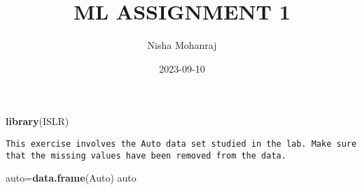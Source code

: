 \documentclass[
]{article}
\title{ML ASSIGNMENT 1}
\author{Nisha Mohanraj}
\date{2023-09-10}
\newenvironment{Shaded}{\begin{snugshade}}{\end{snugshade}}
\newcommand{\FunctionTok}[1]{\textcolor[rgb]{0.13,0.29,0.53}{\textbf{#1}}}
\newcommand{\NormalTok}[1]{#1}
\newcommand{\OtherTok}[1]{\textcolor[rgb]{0.56,0.35,0.01}{#1}}
\begin{document}
\maketitle

\begin{Shaded}
\begin{Highlighting}[]
\FunctionTok{library}\NormalTok{(ISLR)}
\end{Highlighting}
\end{Shaded}

\begin{verbatim}
This exercise involves the Auto data set studied in the lab. Make sure that the missing values have been removed from the data.
\end{verbatim}

\begin{Shaded}
\begin{Highlighting}[]
\NormalTok{auto}\OtherTok{=}\FunctionTok{data.frame}\NormalTok{(Auto)}
\NormalTok{auto}
\end{Highlighting}
\end{Shaded}
\end{document}
